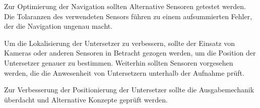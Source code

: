 \documentclass[
  a4paper,
  12pt,
  DIV=12,        %
  parskip=half,  %
  headings=small %
]{scrartcl}
\theoremstyle{definition}
\theoremstyle{definition}
\begin{document}
Zur Optimierung der Navigation sollten Alternative Sensoren getestet werden. Die Tolaranzen des verwendeten Sensors führen zu einem aufsummierten Fehler, der die Navigation ungenau macht.

Um die Lokalisierung der Untersetzer zu verbessern, sollte der Einsatz von Kameras oder anderen Sensoren in Betracht gezogen werden, um die Position der Untersetzer genauer zu bestimmen. Weiterhin sollten Sensoren vorgesehen werden, die die Anwesenheit von Untersetzern unterhalb der Aufnahme prüft.

Zur Verbesserung der Positionierung der Untersetzer sollte die Ausgabemechanik überdacht und Alternative Konzepte geprüft werden.
\end{document}
